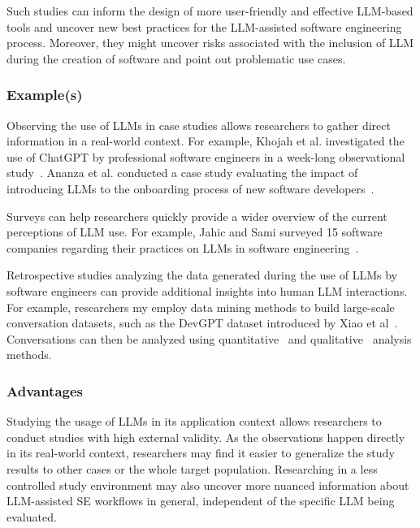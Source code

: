 Such studies can inform the design of more user-friendly and effective LLM-based tools and uncover new best practices for the LLM-assisted software engineering process.
Moreover, they might uncover risks associated with the inclusion of LLM during the creation of software and point out problematic use cases.

\subsubsection{Example(s)}

Observing the use of LLMs in case studies allows researchers to gather direct information in a real-world context.
For example, Khojah et al. investigated the use of ChatGPT by professional software engineers in a week-long observational study~\cite{DBLP:journals/pacmse/KhojahM0N24}.
Ananza et al. conducted a case study evaluating the impact of introducing LLMs to the onboarding process of new software developers~\cite{DBLP:conf/csee/AzanzaPIG24}.

Surveys can help researchers quickly provide a wider overview of the current perceptions of LLM use.
For example, Jahic and Sami surveyed 15 software companies regarding their practices on LLMs in software engineering~\cite{DBLP:conf/icsa/JahicS24}.

Retrospective studies analyzing the data generated during the use of LLMs by software engineers can provide additional insights into human LLM interactions.
For example, researchers my employ data mining methods to build large-scale conversation datasets, such as the DevGPT dataset introduced by Xiao et al~\cite{DBLP:conf/msr/XiaoTHM24}.
Conversations can then be analyzed using quantitative~\cite{DBLP:conf/msr/RabbiCZI24} and qualitative~\cite{DBLP:conf/msr/MohamedPP24} analysis methods.

\subsubsection{Advantages}

Studying the usage of LLMs in its application context allows researchers to conduct studies with high external validity.
As the observations happen directly in its real-world context, researchers may find it easier to generalize the study results to other cases or the whole target population.
Researching in a less controlled study environment may also uncover more nuanced information about LLM-assisted SE workflows in general, independent of the specific LLM being evaluated.


